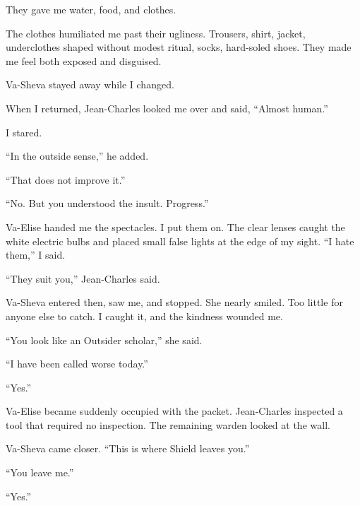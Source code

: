 They gave me water, food, and clothes.\par

The clothes humiliated me past their ugliness. Trousers, shirt, jacket, underclothes shaped without modest ritual, socks, hard-soled shoes. They made me feel both exposed and disguised.\par

Va-Sheva stayed away while I changed.\par

When I returned, Jean-Charles looked me over and said, ``Almost human.''\par

I stared.\par

``In the outside sense,'' he added.\par

``That does not improve it.''\par

``No. But you understood the insult. Progress.''\par

Va-Elise handed me the spectacles. I put them on. The clear lenses caught the white electric bulbs and placed small false lights at the edge of my sight. ``I hate them,'' I said.\par

``They suit you,'' Jean-Charles said.\par

Va-Sheva entered then, saw me, and stopped. She nearly smiled. Too little for anyone else to catch. I caught it, and the kindness wounded me.\par

``You look like an Outsider scholar,'' she said.\par

``I have been called worse today.''\par

``Yes.''\par

Va-Elise became suddenly occupied with the packet. Jean-Charles inspected a tool that required no inspection. The remaining warden looked at the wall.\par

Va-Sheva came closer. ``This is where Shield leaves you.''\par

``You leave me.''\par

``Yes.''\par

